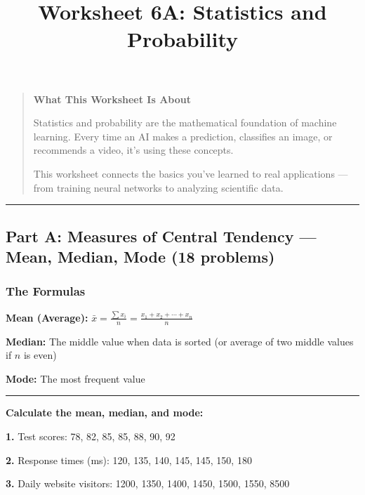\documentclass[
  11pt,
]{article}
\title{Worksheet 6A: Statistics and Probability}
\author{}
\date{}
\begin{document}
\maketitle

\begin{quote}
\textbf{What This Worksheet Is About}

Statistics and probability are the mathematical foundation of machine
learning. Every time an AI makes a prediction, classifies an image, or
recommends a video, it's using these concepts.

This worksheet connects the basics you've learned to real applications
--- from training neural networks to analyzing scientific data.
\end{quote}

\begin{center}\rule{0.5\linewidth}{0.5pt}\end{center}

\hypertarget{part-a-measures-of-central-tendency-mean-median-mode-18-problems}{%
\subsection{Part A: Measures of Central Tendency --- Mean, Median, Mode
(18
problems)}\label{part-a-measures-of-central-tendency-mean-median-mode-18-problems}}

\hypertarget{the-formulas}{%
\subsubsection{The Formulas}\label{the-formulas}}

\textbf{Mean (Average):}
\(\bar{x} = \frac{\sum x_i}{n} = \frac{x_1 + x_2 + \cdots + x_n}{n}\)

\textbf{Median:} The middle value when data is sorted (or average of two
middle values if \(n\) is even)

\textbf{Mode:} The most frequent value

\begin{center}\rule{0.5\linewidth}{0.5pt}\end{center}

\textbf{Calculate the mean, median, and mode:}

\textbf{1.} Test scores: 78, 82, 85, 85, 88, 90, 92

\textbf{2.} Response times (ms): 120, 135, 140, 145, 145, 150, 180

\textbf{3.} Daily website visitors: 1200, 1350, 1400, 1450, 1500, 1550,
8500
\end{document}
